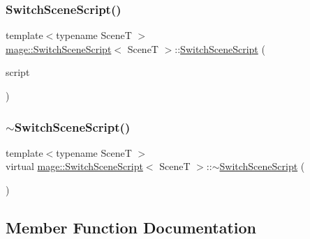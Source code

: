 \hypertarget{classmage_1_1_switch_scene_script_a6803282c82656616ac7459b34e85fdc7}{}\label{classmage_1_1_switch_scene_script_a6803282c82656616ac7459b34e85fdc7} 
\subsubsection{\texorpdfstring{Switch\+Scene\+Script()}{SwitchSceneScript()}\hspace{0.1cm}{\footnotesize\ttfamily [3/3]}}
{\footnotesize\ttfamily template$<$typename SceneT $>$ \\
\hyperlink{classmage_1_1_switch_scene_script}{mage\+::\+Switch\+Scene\+Script}$<$ SceneT $>$\+::\hyperlink{classmage_1_1_switch_scene_script}{Switch\+Scene\+Script} (\begin{DoxyParamCaption}\item[{\hyperlink{classmage_1_1_switch_scene_script}{Switch\+Scene\+Script}$<$ SceneT $>$ \&\&}]{script }\end{DoxyParamCaption})}

\hypertarget{classmage_1_1_switch_scene_script_a9c5907dfea7512a934e37136a9e3970b}{}\label{classmage_1_1_switch_scene_script_a9c5907dfea7512a934e37136a9e3970b} 
\subsubsection{\texorpdfstring{$\sim$\+Switch\+Scene\+Script()}{~SwitchSceneScript()}}
{\footnotesize\ttfamily template$<$typename SceneT $>$ \\
virtual \hyperlink{classmage_1_1_switch_scene_script}{mage\+::\+Switch\+Scene\+Script}$<$ SceneT $>$\+::$\sim$\hyperlink{classmage_1_1_switch_scene_script}{Switch\+Scene\+Script} (\begin{DoxyParamCaption}{ }\end{DoxyParamCaption})\hspace{0.3cm}{\ttfamily [virtual]}}



\subsection{Member Function Documentation}
\hypertarget{classmage_1_1_switch_scene_script_afa17a58d641d05ac406fecb43c84ec2b}{}\label{classmage_1_1_switch_scene_script_afa17a58d641d05ac406fecb43c84ec2b} 
